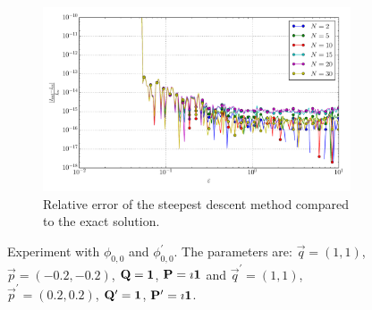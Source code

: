 \documentclass[a4paper,10pt]{article}
\begin{document}
\begin{figure}[ht!]
\begin{subfigure}[t]{0.5\linewidth}
    \includegraphics[width=\linewidth]{./plots/tp_2d_conv_eps_(0,0)_(0,0)_err_rel_nsd.pdf}
    \caption{Relative error of the steepest descent method compared to the exact solution.}
    \label{fig:tp_2d_conv_eps_00_00_err_nsd}
  \end{subfigure}
  \label{fig:tp_2d_conv_eps_00_00}
  \caption{Experiment with $\phi_{0,0}$ and $\phi_{0,0}^{\prime}$.
  The parameters are:
  $\vec{q} = (1, 1)$,
  $\vec{p} = (-0.2, -0.2)$,
  $\mathbf{Q} = \mathbf{1}$,
  $\mathbf{P} = \imath \mathbf{1}$
  and
  $\vec{q}^\prime = (1, 1)$,
  $\vec{p}^\prime = (0.2, 0.2)$,
  $\mathbf{Q}^\prime = \mathbf{1}$,
  $\mathbf{P}^\prime = \imath \mathbf{1}$.}
\end{figure}
\end{document}
